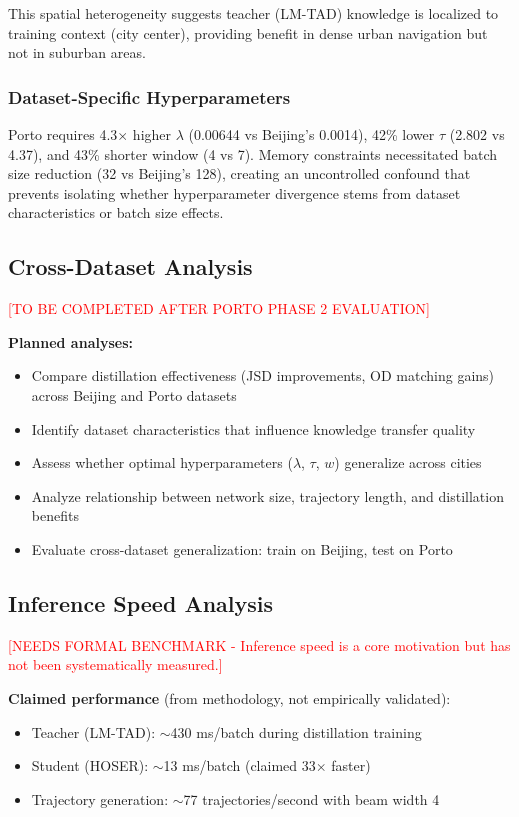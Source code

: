 This spatial heterogeneity suggests teacher (LM-TAD) knowledge is localized to training context (city center), providing benefit in dense urban navigation but not in suburban areas.

\subsubsection{Dataset-Specific Hyperparameters}

Porto requires 4.3$\times$ higher $\lambda$ (0.00644 vs Beijing's 0.0014), 42\% lower $\tau$ (2.802 vs 4.37), and 43\% shorter window (4 vs 7). Memory constraints necessitated batch size reduction (32 vs Beijing's 128), creating an uncontrolled confound that prevents isolating whether hyperparameter divergence stems from dataset characteristics or batch size effects.

\subsection{Cross-Dataset Analysis}
\label{sec:eval-cross}

\textcolor{red}{[TO BE COMPLETED AFTER PORTO PHASE 2 EVALUATION]}

\textbf{Planned analyses:}
\begin{itemize}[noitemsep,topsep=0pt]
    \item Compare distillation effectiveness (JSD improvements, OD matching gains) across Beijing and Porto datasets
    \item Identify dataset characteristics that influence knowledge transfer quality
    \item Assess whether optimal hyperparameters ($\lambda$, $\tau$, $w$) generalize across cities
    \item Analyze relationship between network size, trajectory length, and distillation benefits
    \item Evaluate cross-dataset generalization: train on Beijing, test on Porto
\end{itemize}

\subsection{Inference Speed Analysis}
\label{sec:eval-inference}

\textcolor{red}{[NEEDS FORMAL BENCHMARK - Inference speed is a core motivation but has not been systematically measured.]}

\textbf{Claimed performance} (from methodology, not empirically validated):
\begin{itemize}[noitemsep,topsep=0pt]
    \item Teacher (LM-TAD): $\sim$430 ms/batch during distillation training
    \item Student (HOSER): $\sim$13 ms/batch (claimed 33$\times$ faster)
    \item Trajectory generation: $\sim$77 trajectories/second with beam width 4
\end{itemize}

